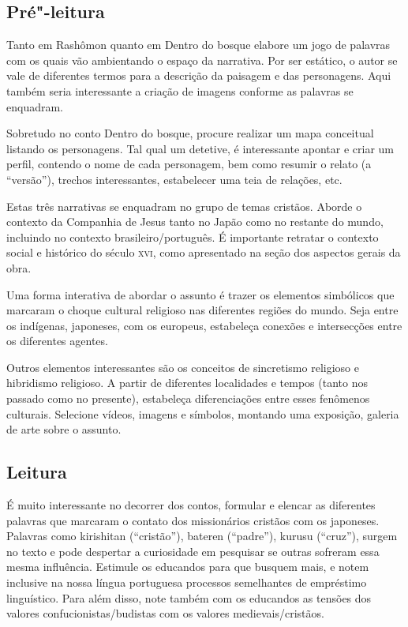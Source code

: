 \documentclass[12pt]{extarticle}
\begin{document}
\subsection{Pré"-leitura}

Tanto em Rashômon quanto em Dentro do bosque elabore um jogo
de palavras com os quais vão ambientando o espaço da narrativa. Por ser
estático, o autor se vale de diferentes termos para a descrição da
paisagem e das personagens. Aqui também seria interessante a criação de
imagens conforme as palavras se enquadram.

Sobretudo no conto Dentro do bosque, procure realizar um mapa conceitual
listando os personagens. Tal qual um detetive, é interessante apontar e
criar um perfil, contendo o nome de cada personagem, bem como resumir o
relato (a ``versão''), trechos interessantes, estabelecer uma teia de
relações, etc.

Estas três narrativas se enquadram no grupo de temas cristãos. Aborde o
contexto da Companhia de Jesus tanto no Japão como no restante do mundo,
incluindo no contexto brasileiro/português. É importante retratar o
contexto social e histórico do século \textsc{xvi}, como apresentado na seção dos
aspectos gerais da obra.

Uma forma interativa de abordar o assunto é trazer os elementos
simbólicos que marcaram o choque cultural religioso nas diferentes
regiões do mundo. Seja entre os indígenas, japoneses, com os europeus,
estabeleça conexões e intersecções entre os diferentes agentes.

Outros elementos interessantes são os conceitos de sincretismo religioso
e hibridismo religioso. A partir de diferentes localidades e tempos
(tanto nos passado como no presente), estabeleça diferenciações entre
esses fenômenos culturais. Selecione vídeos, imagens e símbolos,
montando uma exposição, galeria de arte sobre o assunto.

\subsection{Leitura}

É muito interessante no decorrer dos contos, formular e
elencar as diferentes palavras que marcaram o contato dos missionários
cristãos com os japoneses. Palavras como kirishitan (``cristão''),
bateren (``padre''), kurusu (``cruz''), surgem no texto e pode despertar
a curiosidade em pesquisar se outras sofreram essa mesma influência.
Estimule os educandos para que busquem mais, e notem inclusive na nossa
língua portuguesa processos semelhantes de empréstimo linguístico. Para
além disso, note também com os educandos as tensões dos valores
confucionistas/budistas com os valores medievais/cristãos.
\end{document}

